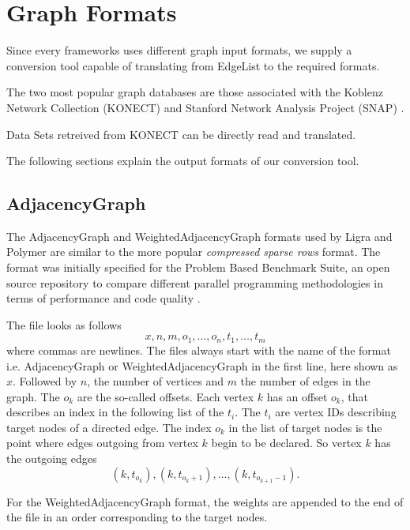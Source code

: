 
\section{Graph Formats}
Since every frameworks uses different graph input formats, we supply a conversion tool capable of translating from EdgeList to the required formats.

The two most popular graph databases are those associated with the Koblenz Network Collection (KONECT) \cite{konect} and Stanford Network Analysis Project (SNAP) \cite{snap}.

Data Sets retreived from KONECT can be directly read and translated.


The following sections explain the output formats of our conversion tool.
\subsection{AdjacencyGraph}
The AdjacencyGraph and WeightedAdjacencyGraph formats used by Ligra and Polymer are similar to the more popular \emph{compressed sparse rows} format.
The format was initially specified for the Problem Based Benchmark Suite, an open source repository to compare different parallel programming methodologies in terms of performance and code quality \cite{pbbs}.

The file looks as follows
\begin{equation*}
	x, n, m, o_1, \ldots, o_n, t_1, \ldots, t_m
\end{equation*}
where commas are newlines. The files always start with the name of the format i.e. AdjacencyGraph or WeightedAdjacencyGraph in the first line, here shown as $x$.
Followed by $n$, the number of vertices and $m$ the number of edges in the graph.
The $o_k$ are the so-called offsets. Each vertex $k$ has an offset $o_k$, that describes an index in the following list of the $t_i$.
The $t_i$ are vertex IDs describing target nodes of a directed edge. 
The index $o_k$ in the list of target nodes is the point where edges outgoing from vertex $k$ begin to be declared. So vertex $k$ has the outgoing edges
\begin{equation*}
	(k, t_{o_k}), (k, t_{o_k+1}),\ldots, (k, t_{o_{k+1}-1}).
\end{equation*}

For the WeightedAdjacencyGraph format, the weights are appended to the end of the file in an order corresponding to the target nodes.


